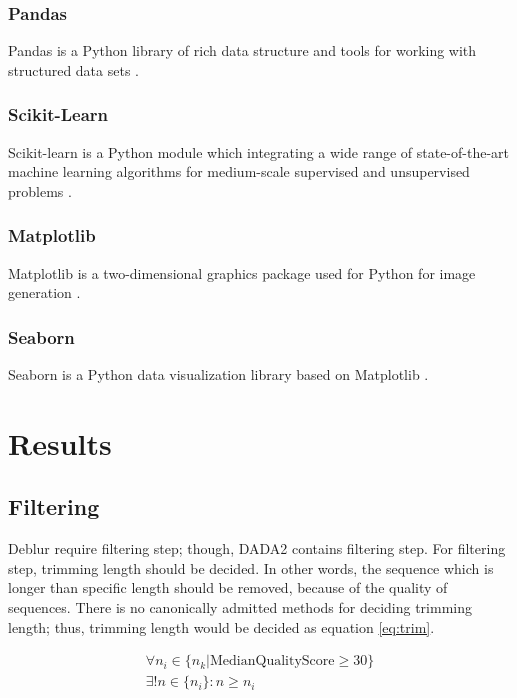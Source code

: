 \documentclass[a4paper]{article}
\begin{document}
            \subsubsection{Pandas}
                Pandas is a Python library of rich data structure and tools for working with structured data sets \cite{pandas1}.

            \subsubsection{Scikit-Learn}
                Scikit-learn is a Python module which integrating a wide range of state-of-the-art machine learning algorithms for medium-scale supervised and unsupervised problems \cite{sklearn1}.

            \subsubsection{Matplotlib}
                Matplotlib is a two-dimensional graphics package used for Python for image generation \cite{matplotlib1}.

            \subsubsection{Seaborn}
                Seaborn is a Python data visualization library based on Matplotlib \cite{seaborn1}.

    \section{Results}
        \subsection{Filtering}
            Deblur require filtering step; though, DADA2 contains filtering step. For filtering step, trimming length should be decided. In other words, the sequence which is longer than specific length should be removed, because of the quality of sequences. There is no canonically admitted methods for deciding trimming length; thus, trimming length would be decided as equation \ref{eq:trim}.

            \begin{equation}
                \begin{array}{c}
                    \forall n_i \in \{ n_k | \mbox{MedianQualityScore} \geq 30 \} \\
                    \exists ! n \in \{n_i\} : n \geq n_i
                \end{array}
                \label{eq:trim}
            \end{equation}
\end{document}
